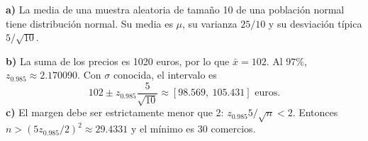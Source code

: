 \textbf{a)} La media de una muestra aleatoria de tamaño 10 de
una población normal tiene distribución normal. Su media
es $\mu$, su varianza $25/10$ y su desviación típica $5/\sqrt{10}$.

\textbf{b)} La suma de los precios es 1020 euros, por lo que
$\bar x=102$. Al $97\%$, $z_{0.985}\approx2.170090$.
Con $\sigma$ conocida, el intervalo es
\[
102\pm z_{0.985}\frac{5}{\sqrt{10}}
\approx\boxed{[98.569,\ 105.431]\text{ euros}}.
\]
\textbf{c)} El margen debe ser estrictamente menor que 2:
$z_{0.985}5/\sqrt n<2$. Entonces
$n>(5z_{0.985}/2)^2\approx29.4331$ y el mínimo es
$\boxed{30}$ comercios.
